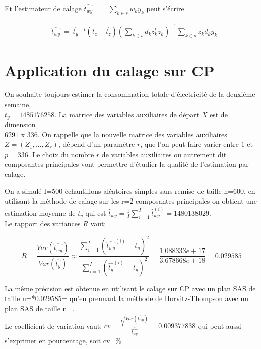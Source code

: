 \documentclass[11pt,fleqn]{book} %
\begin{document}
Et l'estimateur de calage $ \hat{t_{wy}} \:\:=\:\:\sum_{k\in s} w_k y_k$ peut s'écrire

\begin{align*}
&  \hat{t_{wy}} \:=\: \hat{t_y} + ^t(t_z-\hat{t_z}) \left( \sum_{k\in s} d_k z_k ^t z_k \right)^{-1}  \sum_{k\in s} z_k d_k y_k
\end{align*}


\section{Application du calage sur CP}

On souhaite toujours estimer la consommation totale d'électricité de la deuxième semaine,\\
$t_y=1485176258$. La matrice des variables auxiliaires de départ $X$ est de dimension \\
$6291$ x $336$. On rappelle que la nouvelle matrice  des variables auxiliaires $Z=\left( Z_1,...,Z_r \right)$, dépend d'un paramètre $r$, que l'on peut faire varier entre $1$ et $p=336$.  Le choix du nombre $r$ de variables auxiliaires ou autrement dit composantes principales vont permettre d'étudier la qualité de l'estimation par calage.  

\vspace{1em}

On a simulé I=500 échantillons aléatoires simples sans remise de taille n=600, en utilisant la méthode de calage sur les r=2 composantes principales on obtient une estimation moyenne de $t_y$ qui est $\bar{\hat{t}}_{wy}=\frac{1}{I}\sum_{i=1}^I \hat{t}_{wy}^{(i)} =1480138029$.\\

Le rapport des variances $R$ vaut:

\begin{equation*}
R=\frac{Var(\hat{t_{wy}})}{Var(\hat{t_y})}\approx\frac{\sum_{i=1}^{I} (\hat{t_{wy}}^{(i)}-t_y)^2}{\sum_{i=1}^{I} (\hat{t_y}^{(i)}-t_y)^2}=\frac{1.088333e+17}{3.678668e+18}=0.029585 
\end{equation*}

La même précision est obtenue en utilisant le calage sur CP avec un plan SAS de taille n\:=*0.029585\:= qu'en prennant la méthode de Horvitz-Thompson avec un plan SAS de taille n\:=.\\


Le coefficient de variation vaut: \quad $ cv=\frac{\sqrt{Var(\hat{t_{wy}})}}{\bar{\hat{t_{wy}}}} = 0.009377838 $  \quad \textnormal{ qui peut aussi s'exprimer en pourcentage, soit cv\:=\%}\\
\end{document}
